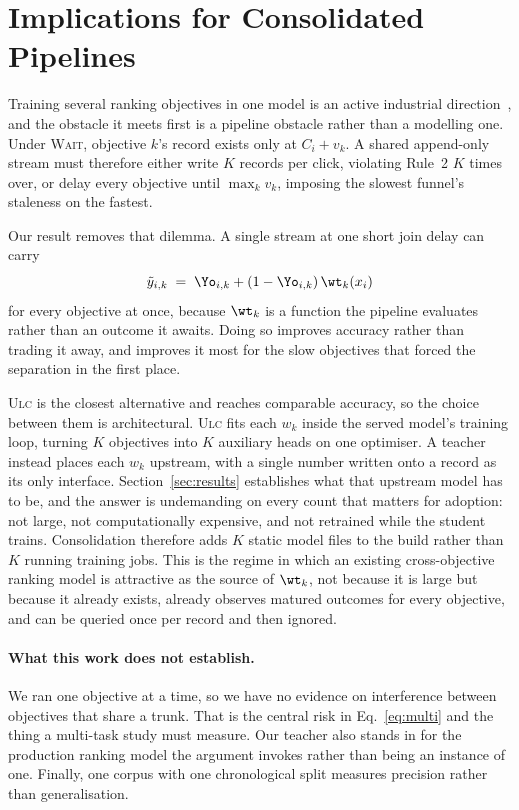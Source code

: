 \section{Implications for Consolidated Pipelines}
\label{sec:consolidation}

Training several ranking objectives in one model is an active industrial
direction~\cite{meta2025gem}, and the obstacle it meets first is a pipeline obstacle rather than
a modelling one. Under \textsc{Wait}, objective $k$'s record exists only at $C_i+v_k$. A shared
append-only stream must therefore either write $K$ records per click, violating Rule~2 $K$ times
over, or delay every objective until $\max_k v_k$, imposing the slowest funnel's staleness on
the fastest.

Our result removes that dilemma. A single stream at one short join delay can carry
\begin{equation}
  \tilde y_{i,k} \;=\; \Yo_{i,k} + (1-\Yo_{i,k})\,\wt_k(x_i)
  \label{eq:multi}
\end{equation}
for every objective at once, because $\wt_k$ is a function the pipeline evaluates rather than an
outcome it awaits. Doing so improves accuracy rather than trading it away, and improves it most
for the slow objectives that forced the separation in the first place.

\textsc{Ulc} is the closest alternative and reaches comparable accuracy, so the choice between
them is architectural. \textsc{Ulc} fits each $w_k$ inside the served model's training loop,
turning $K$ objectives into $K$ auxiliary heads on one optimiser. A teacher instead places each
$w_k$ upstream, with a single number written onto a record as its only interface.
Section~\ref{sec:results} establishes what that upstream model has to be, and the answer is
undemanding on every count that matters for adoption: not large, not computationally expensive,
and not retrained while the student trains. Consolidation therefore adds $K$ static model files
to the build rather than $K$ running training jobs. This is the regime in which an existing
cross-objective ranking model is attractive as the source of $\wt_k$, not because it is large
but because it already exists, already observes matured outcomes for every objective, and can be
queried once per record and then ignored.

\paragraph{What this work does not establish.} We ran one objective at a time, so we have no
evidence on interference between objectives that share a trunk. That is the central risk in
Eq.~\eqref{eq:multi} and the thing a multi-task study must measure. Our teacher also stands in
for the production ranking model the argument invokes rather than being an instance of one.
Finally, one corpus with one chronological split measures precision rather than generalisation.

